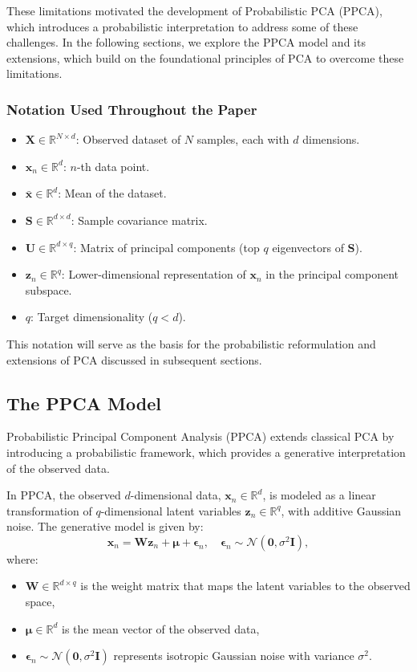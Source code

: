 \documentclass{article}
\begin{document}
These limitations motivated the development of Probabilistic PCA (PPCA), which introduces a probabilistic interpretation to address some of these challenges. In the following sections, we explore the PPCA model and its extensions, which build on the foundational principles of PCA to overcome these limitations.

\subsubsection*{Notation Used Throughout the Paper}
\begin{itemize}
    \item $\mathbf{X} \in \mathbb{R}^{N \times d}$: Observed dataset of $N$ samples, each with $d$ dimensions.
    \item $\mathbf{x}_n \in \mathbb{R}^d$: $n$-th data point.
    \item $\bar{\mathbf{x}} \in \mathbb{R}^d$: Mean of the dataset.
    \item $\mathbf{S} \in \mathbb{R}^{d \times d}$: Sample covariance matrix.
    \item $\mathbf{U} \in \mathbb{R}^{d \times q}$: Matrix of principal components (top $q$ eigenvectors of $\mathbf{S}$).
    \item $\mathbf{z}_n \in \mathbb{R}^q$: Lower-dimensional representation of $\mathbf{x}_n$ in the principal component subspace.
    \item $q$: Target dimensionality ($q < d$).
\end{itemize}

This notation will serve as the basis for the probabilistic reformulation and extensions of PCA discussed in subsequent sections.

\subsection{The PPCA Model}
Probabilistic Principal Component Analysis (PPCA) extends classical PCA by introducing a probabilistic framework, which provides a generative interpretation of the observed data.

In PPCA, the observed \( d \)-dimensional data, \( \mathbf{x}_n \in \mathbb{R}^d \), is modeled as a linear transformation of \( q \)-dimensional latent variables \( \mathbf{z}_n \in \mathbb{R}^q \), with additive Gaussian noise. The generative model is given by:
\[
\mathbf{x}_n = \mathbf{W} \mathbf{z}_n + \boldsymbol{\mu} + \boldsymbol{\epsilon}_n, \quad \boldsymbol{\epsilon}_n \sim \mathcal{N}(\mathbf{0}, \sigma^2 \mathbf{I}),
\]
where:
\begin{itemize}
    \item \( \mathbf{W} \in \mathbb{R}^{d \times q} \) is the weight matrix that maps the latent variables to the observed space,
    \item \( \boldsymbol{\mu} \in \mathbb{R}^d \) is the mean vector of the observed data,
    \item \( \boldsymbol{\epsilon}_n \sim \mathcal{N}(\mathbf{0}, \sigma^2 \mathbf{I}) \) represents isotropic Gaussian noise with variance \( \sigma^2 \).
\end{itemize}
\end{document}
